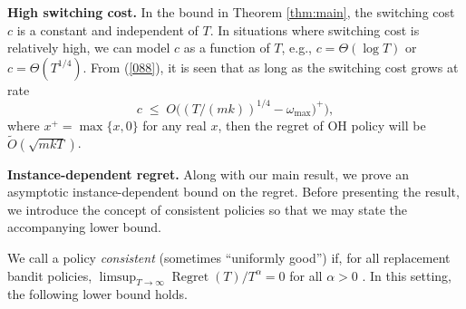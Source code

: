 \documentclass[opre,blindrev]{informs3}
\newcommand{\Regret}{\operatorname{Regret}}
\begin{document}
{\bf High switching cost.} In the bound in Theorem \ref{thm:main}, the switching cost $c$ is a constant and independent of $T$. In situations where switching cost is relatively high, we can model $c$ as 
a function of $T$, e.g., $c=\Theta(\log T)$ or $c=\Theta(T^{1/4})$. From (\ref{088}), it is seen that as long as the switching cost grows at rate  
$$c\;\le \; O\big((T/(mk))^{1/4}-\omega_{\max})^+\big),$$ 
where $x^+=\max\{x, 0\}$ for any real $x$, then the regret of \textsc{OH} policy will be $\tilde O(\sqrt{mkT})$. 

{\bf Instance-dependent regret.} Along with our main result, we prove an asymptotic instance-dependent bound on the regret. Before presenting the result, we introduce the concept of consistent policies so that we may state the accompanying lower bound. 

We call a policy \emph{consistent} (sometimes ``uniformly good'') if, for all replacement bandit policies, \(\limsup_{T\to \infty}\Regret(T)/T^\alpha=0\) for all \(\alpha>0\) \citep{lattimore2020bandit}. In this setting, the following lower bound holds. 
\end{document}
